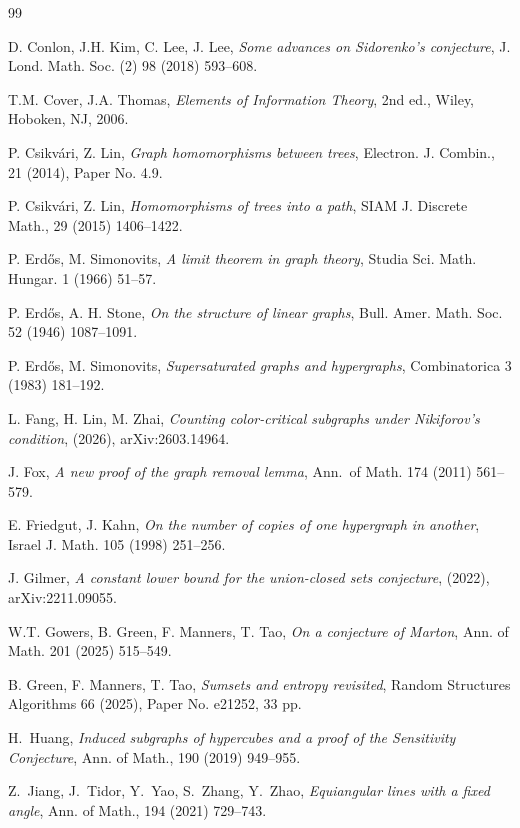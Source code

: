\documentclass[11pt, a4paper]{article}
\theoremstyle{definition}
\theoremstyle{plain}
\begin{document}
\begin{thebibliography}{99}
  
D. Conlon, J.H. Kim, C. Lee, J. Lee,
\emph{Some advances on Sidorenko's conjecture},
{J. Lond. Math. Soc. (2)}  {98} (2018)  593--608.

T.M. Cover, J.A. Thomas,
\emph{Elements of Information Theory},
2nd ed., Wiley, Hoboken, NJ, 2006.

P. Csikv\'ari, Z. Lin,
\emph{Graph homomorphisms between trees},
{Electron. J. Combin.}, 21 (2014),
  Paper No. 4.9.
  
  
P. Csikv\'ari, Z. Lin,
\emph{Homomorphisms of trees into a path},
{SIAM J. Discrete Math.}, 29 (2015) 1406--1422.

P. Erd\H{o}s, M. Simonovits,
\emph{A limit theorem in graph theory},
{Studia Sci. Math. Hungar.}  {1} (1966) 51--57.

P. Erd\H{o}s, A. H. Stone,
\emph{On the structure of linear graphs},
{Bull. Amer. Math. Soc.}  {52} (1946) 1087--1091.

P. Erd\H{o}s, M. Simonovits,
\emph{Supersaturated graphs and hypergraphs},
{Combinatorica}  {3} (1983) 181--192.

L. Fang, H. Lin, M. Zhai,
\emph{Counting color-critical subgraphs under Nikiforov's condition},  
(2026), arXiv:2603.14964.

J. Fox,
\emph{A new proof of the graph removal lemma},
{Ann.\ of Math.}  {174} (2011) 561--579.

E. Friedgut, J. Kahn,
\emph{On the number of copies of one hypergraph in another},
{Israel J. Math.}  {105} (1998) 251--256.


J. Gilmer,
\emph{A constant lower bound for the union-closed
sets conjecture}, (2022), arXiv:2211.09055.

W.T. Gowers, B. Green, F. Manners, T. Tao,
\emph{On a conjecture of Marton},
{Ann. of Math.}  {201} (2025) 515--549.

B. Green, F. Manners, T. Tao,
\emph{Sumsets and entropy revisited},
{Random Structures Algorithms}  {66} (2025), Paper No. e21252, 33 pp. 

H.~Huang, 
\emph{Induced subgraphs of hypercubes and a proof of the {Sensitivity} {Conjecture}}, 
Ann. of Math.,  {190} (2019) 949--955.

Z.~Jiang, J.~Tidor, Y.~Yao, S.~Zhang, Y.~Zhao, 
\emph{Equiangular lines with a fixed angle}, 
 Ann. of Math., {194} (2021) 729--743.


\end{thebibliography}
\end{document}
